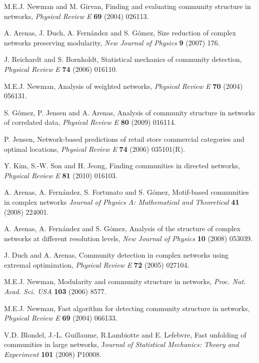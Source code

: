 \documentclass[11pt]{article}
\begin{document}
\begin{thebibliography}{99}

M.E.J. Newman and M. Girvan,
Finding and evaluating community structure in networks,
{\em Physical Review E} {\bf 69} (2004) 026113.

A. Arenas, J. Duch, A. Fern\'andez and S. G\'omez,
Size reduction of complex networks preserving modularity,
{\em New Journal of Physics} {\bf 9} (2007) 176.

J. Reichardt and S. Bornholdt,
Statistical mechanics of community detection,
{\em Physical Review E} {\bf 74} (2006) 016110.

M.E.J. Newman,
Analysis of weighted networks,
{\em Physical Review E} {\bf 70} (2004) 056131.

S. G\'omez, P. Jensen and A. Arenas,
Analysis of community structure in networks of correlated data,
{\em Physical Review E} {\bf 80} (2009) 016114.

P. Jensen,
Network-based predictions of retail store commercial categories and optimal locations,
{\em Physical Review E} {\bf 74} (2006) 035101(R).

Y. Kim, S.-W. Son and H. Jeong,
Finding communities in directed networks,
{\em Physical Review E} {\bf 81} (2010) 016103.

A. Arenas, A. Fern\'andez, S. Fortunato and S. G\'omez,
Motif-based communities in complex networks
{\em Journal of Physics A: Mathematical and Theoretical} {\bf 41} (2008) 224001.

A. Arenas, A. Fern\'andez and S. G\'omez,
Analysis of the structure of complex networks at different resolution levels,
{\em New Journal of Physics} {\bf 10} (2008) 053039.

J. Duch and A. Arenas,
Community detection in complex networks using extremal optimization,
{\em Physical Review E} {\bf 72} (2005) 027104.

M.E.J. Newman,
Modularity and community structure in networks,
{\em Proc. Nat. Acad. Sci. USA} {\bf 103} (2006) 8577.

M.E.J. Newman,
Fast algorithm for detecting community structure in networks,
{\em Physical Review E} {\bf 69} (2004) 066133.

V.D. Blondel, J.-L. Guillaume, R.Lambiotte and E. Lefebvre,
Fast unfolding of communities in large networks,
J{\em ournal of Statistical Mechanics: Theory and Experiment} {\bf 101} (2008) P10008.

\end{thebibliography}
\end{document}
